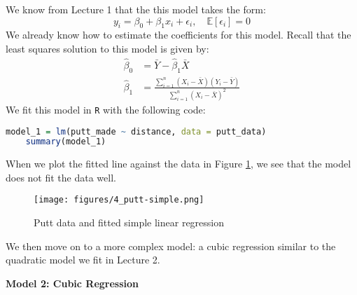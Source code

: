 \documentclass[twoside]{article}
\theoremstyle{definition}
\begin{document}
We know from Lecture 1 that the this model takes the form:
\begin{equation}
    y_i = \beta_0 + \beta_1 x_i + \epsilon_i, \quad \mathbb{E}[\epsilon_i] = 0
\end{equation}
We already know how to estimate the coefficients for this model. Recall that the least squares solution to this model is given by:
\begin{align}
    \widehat{\beta}_0 &= \bar{Y} - \widehat{\beta}_1 \bar{X} \\
    \widehat{\beta}_1 &= \frac{\sum_{i=1}^n (X_i - \bar{X})(Y_i - \bar{Y})}{\sum_{i=1}^n (X_i - \bar{X})^2}
\end{align}
We fit this model in \texttt{R} with the following code:
\begin{lstlisting}[language=R]
    model_1 = lm(putt_made ~ distance, data = putt_data)
    summary(model_1)
\end{lstlisting}
When we plot the fitted line against the data in Figure \ref{fig:putt-simple}, we see that the model does not fit the data well.
\begin{figure}[H]
    \centering
    \texttt{[image: figures/4\_putt-simple.png]}
    \caption{Putt data and fitted simple linear regression}
    \label{fig:putt-simple}
\end{figure}
We then move on to a more complex model: a cubic regression similar to the quadratic model we fit in Lecture 2.

\textbf{Model 2: Cubic Regression}
\end{document}
